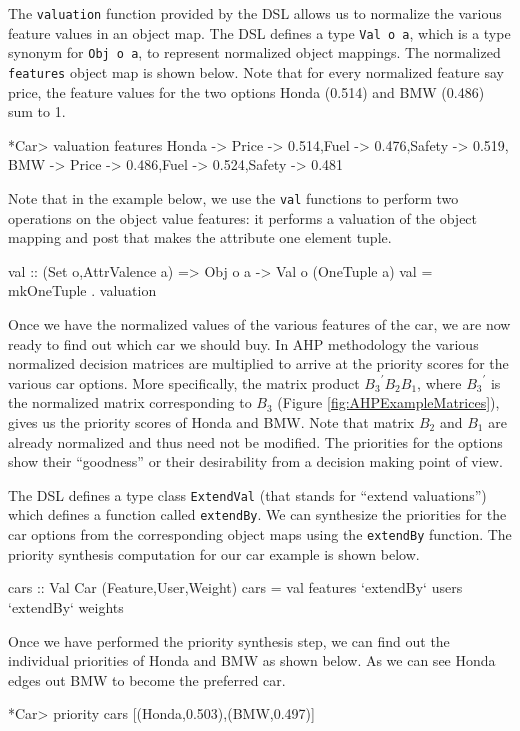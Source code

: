 \documentclass{jfp}
\newcommand{\prog}[1]{\texttt{#1}}
\begin{document}
The \prog{valuation} function provided by the DSL allows us to normalize the various feature values in an object map. The DSL defines a type \prog{Val o a}, which is a type synonym for \prog{Obj o a}, to represent normalized object mappings. The normalized \prog{features} object map is shown below. Note that for every normalized feature say price, the feature values for the two options Honda (0.514) and BMW (0.486) sum to 1.  
\begin{haskellcode}
*Car> valuation features
{Honda -> {Price -> 0.514,Fuel -> 0.476,Safety -> 0.519},
 BMW   -> {Price -> 0.486,Fuel -> 0.524,Safety -> 0.481}}
\end{haskellcode}
Note that in the example below, we use the \prog{val} functions to perform two operations on the object value features: it performs a valuation of the object mapping and post that makes the attribute one element tuple.
\begin{haskellcode}
val :: (Set o,AttrValence a) => Obj o a -> Val o (OneTuple a)
val = mkOneTuple . valuation
\end{haskellcode}

Once we have the normalized values of the various features of the car, we are now ready to find out which car we should buy. In AHP methodology the various normalized decision matrices are multiplied to arrive at the priority scores for the various car options. More specifically, the matrix product ${B_3}^{'} B_2 B_1$, where ${B_3}^{'}$ is the normalized matrix corresponding to $B_3$ (Figure \ref{fig:AHPExampleMatrices}), gives us the priority scores of Honda and BMW. Note that matrix $B_2$ and $B_1$ are already normalized and thus need not be modified. The priorities for the options show their ``goodness'' or their desirability from a decision making point of view. 

The DSL defines a type class \prog{ExtendVal} (that stands for ``extend valuations'') which defines a function called \prog{extendBy}. We can synthesize the priorities for the car options from the corresponding object maps using the \prog{extendBy} function. The priority synthesis computation for our car example is shown below. 
\begin{haskellcode}
cars :: Val Car (Feature,User,Weight)
cars = val features `extendBy` users `extendBy` weights
\end{haskellcode}

Once we have performed the priority synthesis step, we can find out the individual priorities of Honda and BMW as shown below. As we can see Honda edges out BMW to become the preferred car. 
\begin{haskellcode}
*Car> priority cars
[(Honda,0.503),(BMW,0.497)]
\end{haskellcode}
\end{document}
